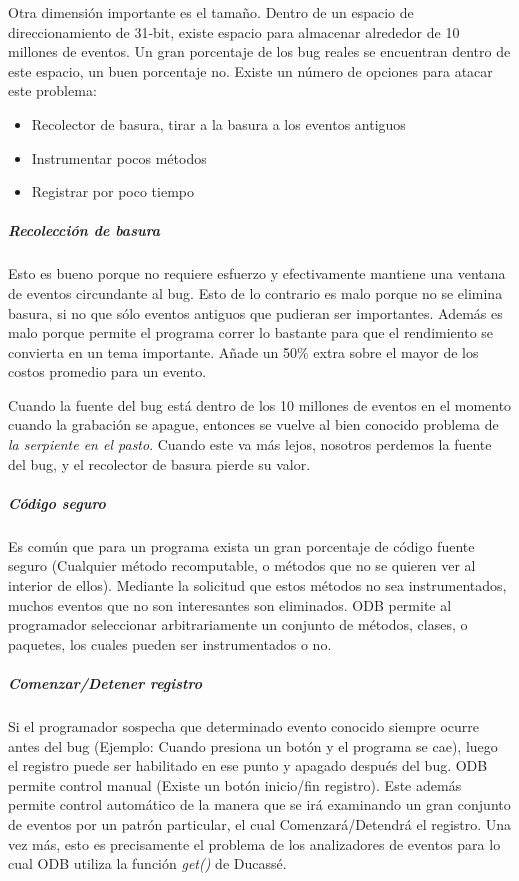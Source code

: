 \documentclass[12pt,legalpaper]{report}
\begin{document}
Otra dimensión importante es el tamaño.  Dentro de un espacio de direccionamiento de 31-bit, existe espacio para almacenar alrededor de 10 millones de eventos.  Un gran porcentaje de los bug reales se encuentran dentro de este espacio, un buen porcentaje no.  Existe un número de opciones para atacar este problema:
\begin{itemize}
	\item Recolector de basura, tirar a la basura a los eventos antiguos
	\item Instrumentar pocos métodos
	\item Registrar por poco tiempo 
\end{itemize}

					\subparagraph{Recolección de basura}

Esto es bueno porque no requiere esfuerzo y efectivamente mantiene una ventana de eventos circundante al bug.  Esto de lo contrario es malo porque no se elimina basura, si no que sólo eventos antiguos que pudieran ser importantes.  Además es malo porque permite el programa correr lo bastante para que el rendimiento se convierta en un tema importante.  Añade un 50\% extra sobre el mayor de los costos promedio para un evento.

Cuando la fuente del bug está dentro de los 10 millones de eventos en el momento cuando la grabación se apague, entonces se vuelve al bien conocido problema de \textit{la serpiente en el pasto}. Cuando este va más lejos, nosotros perdemos la fuente del bug, y el recolector de basura pierde su valor.

					\subparagraph{Código seguro}

Es común que para un programa exista un gran porcentaje de código fuente seguro (Cualquier método recomputable, o métodos que no se quieren ver al interior de ellos).  Mediante la solicitud que estos métodos no sea instrumentados, muchos eventos que no son interesantes son eliminados.  ODB permite al programador seleccionar arbitrariamente un conjunto de métodos, clases, o paquetes, los cuales pueden ser instrumentados o no.

					\subparagraph{Comenzar/Detener registro}

Si el programador sospecha que determinado evento conocido siempre ocurre antes del bug (Ejemplo: Cuando presiona un botón y el programa se cae), luego el registro puede ser habilitado en ese punto y apagado después del bug.  ODB permite control manual (Existe un botón inicio/fin registro).  Este además permite control automático de la manera que se irá examinando un gran conjunto de eventos por un patrón particular, el cual Comenzará/Detendrá el registro.  Una vez más, esto es precisamente el problema de los analizadores de eventos para lo cual ODB utiliza la función \textit{get()} de Ducassé.
\end{document}
